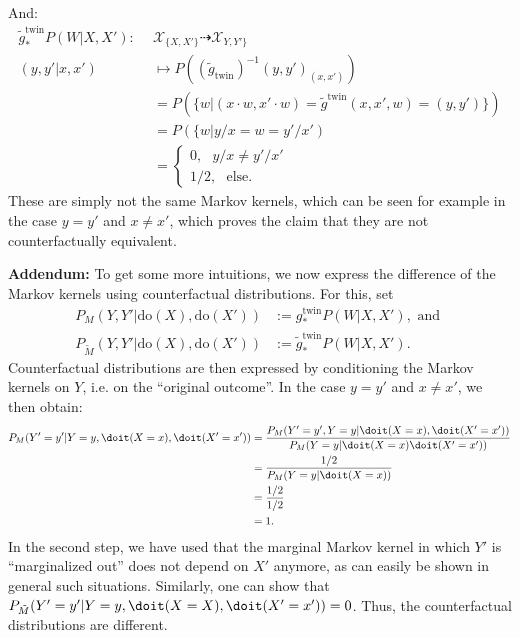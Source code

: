 \begin{enumerate}
\begin{gradedsolution}
\begin{enumerate}
\begin{align*}
	\end{align*}
	And:
	\begin{align*}
		\tilde{g}^{\text{twin}}_* P(W | X, X'): \ \  & \mathcal{X}_{\{X,X'\}} \dashrightarrow \mathcal{X}_{Y,Y'\}} \\
		(y, y' | x, x') & \mapsto P\left((\tilde{g}_{\text{twin}})^{-1}(y,y')_{(x,x')}\right) \\
		& = P\left(\{w | (x \cdot w, x' \cdot w) = \tilde{g}^{\text{twin}}(x, x', w) = (y, y')\}\right) \\
		& = P\left(\{w | y/x = w = y'/x'\right) \\
		& = \begin{cases} 0, \ \ \ y/x \neq y'/x' \\ 1/2, \ \ \ \text{else}.\end{cases}
	\end{align*}
	These are simply not the same Markov kernels, which can be seen for example in the case $y = y'$ and $x \neq x'$, which proves the claim that they are not counterfactually equivalent.

	\textbf{Addendum:} To get some more intuitions, we now express the difference of the Markov kernels using counterfactual distributions.
	For this, set 
	\begin{align*}
		P_{M}(Y, Y' | \text{do}(X), \text{do}(X')) & := g_{*}^{\text{twin}}P(W | X, X'), \text{ and } \\
		P_{\tilde{M}}(Y, Y' | \text{do}(X), \text{do}(X')) & :=  \tilde{g}_*^{\text{twin}}P(W | X, X').
	\end{align*}
	Counterfactual distributions are then expressed by conditioning the Markov kernels on $Y$, i.e. on the ``original outcome''.
	In the case $y = y'$ and $x \neq x'$, we then obtain:
	\begin{align*}
		P_{M}(Y' = y' | Y = y, \doit(X = x), \doit(X' = x')) & = \frac{P_{M}(Y' = y', Y = y | \doit(X = x), \doit(X' = x'))}{P_{M}(Y = y | \doit(X = x) \doit(X ' = x'))} \\
		& = \frac{1/2}{P_{M}(Y = y | \doit(X = x))} \\
		& = \frac{1/2}{1/2} \\
		& = 1.
	\end{align*}
	In the second step, we have used that the marginal Markov kernel in which $Y'$ is ``marginalized out'' does not depend on $X'$ anymore, as can easily be shown in general such situations. 
	Similarly, one can show that $P_{\tilde{M}}(Y' = y' | Y = y, \doit(X = X), \doit(X' = x')) = 0$.
	Thus, the counterfactual distributions are different.


\end{enumerate}
\end{gradedsolution}
\end{enumerate}
